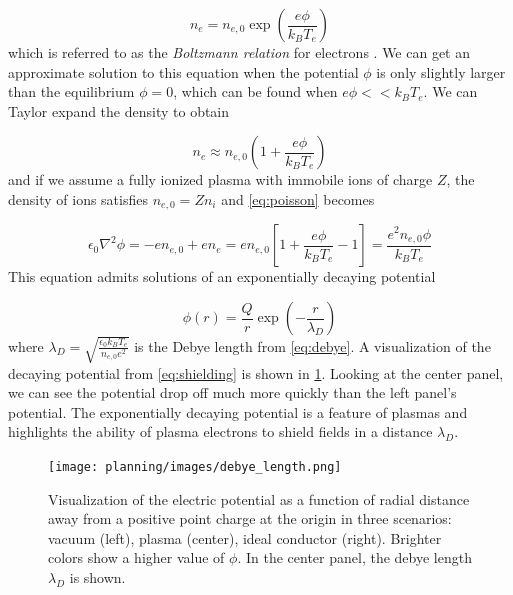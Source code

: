 \begin{equation}
	n_e = n_{e,0} \exp(\frac{e \phi}{k_B T_e}) \label{eq:boltzmann}
\end{equation}
which is referred to as the \emph{Boltzmann relation} for electrons \cite{Chen_2015_Plasma}. We can get an approximate solution to this equation when the potential $\phi$ is only slightly larger than the equilibrium $\phi=0$, which can be found when $e \phi << k_B T_e$. We can Taylor expand the density to obtain 

\begin{equation}
	n_e \approx n_{e,0}(1 + \frac{e \phi}{k_B T_e})
\end{equation} 
and if we assume a fully ionized plasma with immobile ions of charge $Z$, the density of ions satisfies $n_{e,0} = Z n_i$ and \cref{eq:poisson} becomes 

\begin{equation}
	\epsilon_0 \nabla^2 \phi = - e n_{e,0} + e n_e = e n_{e,0} [1 + \frac{e \phi}{k_B T_e} - 1] = \frac{e^2 n_{e,0} \phi}{k_B T_e}
\end{equation}
This equation admits solutions of an exponentially decaying potential

\begin{equation}
	\phi(r) = \frac{Q}{r} \exp(-\frac{r}{\lambda_{D}}) \label{eq:shielding}
\end{equation}
where $\lambda_D = \sqrt{\frac{\epsilon_0 k_B T_e}{n_{e,0} e^2}}$ is the Debye length from \cref{eq:debye}. A visualization of the decaying potential from \cref{eq:shielding} is shown in \cref{fig:debye}. Looking at the center panel, we can see the potential drop off much more quickly than the left panel's potential. The exponentially decaying potential is a feature of plasmas and highlights the ability of plasma electrons to shield fields in a distance $\lambda_D$. 

\begin{figure}
	\centering 
	\texttt{[image: planning/images/debye\_length.png]}
	\caption{Visualization of the electric potential as a function of radial distance away from a positive point charge at the origin in three scenarios: vacuum (left), plasma (center), ideal conductor (right). Brighter colors show a higher value of $\phi$. In the center panel, the debye length $\lambda_D$ is shown.}
	\label{fig:debye}
\end{figure}

